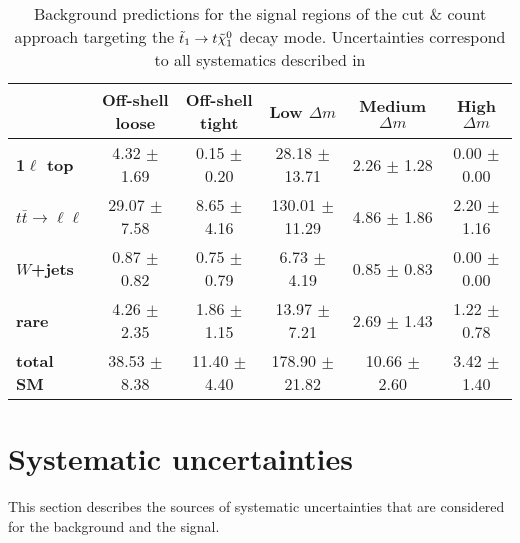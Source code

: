         \begin{table}[!ht]
            \begin{center}
                { \footnotesize
                \begin{tabular}{|l|ccccc|}
                    \hline
                    &
                    \textbf{Off-shell loose}    &
                    \textbf{Off-shell tight}    &
                    \textbf{Low $\Delta m$}     &
                    \textbf{Medium $\Delta m$}  &
                    \textbf{High $\Delta m$}    \\
                    \hline
                    \textbf{1$\ell$ top}     & 4.32 $\pm$ 1.69   & 0.15 $\pm$ 0.20   & 28.18 $\pm$ 13.71     & 2.26 $\pm$ 1.28   & 0.00 $\pm$ 0.00   \\
                    \textbf{$t\bar{t} \rightarrow \ell \ell$}    & 29.07 $\pm$ 7.58      & 8.65 $\pm$ 4.16   & 130.01 $\pm$ 11.29    & 4.86 $\pm$ 1.86   & 2.20 $\pm$ 1.16   \\
                    \textbf{$W$+jets}    & 0.87 $\pm$ 0.82   & 0.75 $\pm$ 0.79   & 6.73 $\pm$ 4.19   & 0.85 $\pm$ 0.83   & 0.00 $\pm$ 0.00   \\
                    \textbf{rare}    & 4.26 $\pm$ 2.35   & 1.86 $\pm$ 1.15   & 13.97 $\pm$ 7.21      & 2.69 $\pm$ 1.43   & 1.22 $\pm$ 0.78   \\
                    \textbf{total SM}    & 38.53 $\pm$ 8.38      & 11.40 $\pm$ 4.40      & 178.90 $\pm$ 21.82    & 10.66 $\pm$ 2.60      & 3.42 $\pm$ 1.40   \\
                    \hline
                \end{tabular}
                }
                \caption{Background predictions for the signal regions of the cut \& count approach targeting the $\tilde{t}_1 \rightarrow t \tilde{\chi}_1^0$ decay mode. Uncertainties correspond
                to all systematics described in }
                \label{tab:report_yield_CnC_T2tt}
            \end{center}
        \end{table}


    \section{Systematic uncertainties \label{sec:analysis_systematics}}

    This section describes the sources of systematic uncertainties that are considered for the background and the signal.

